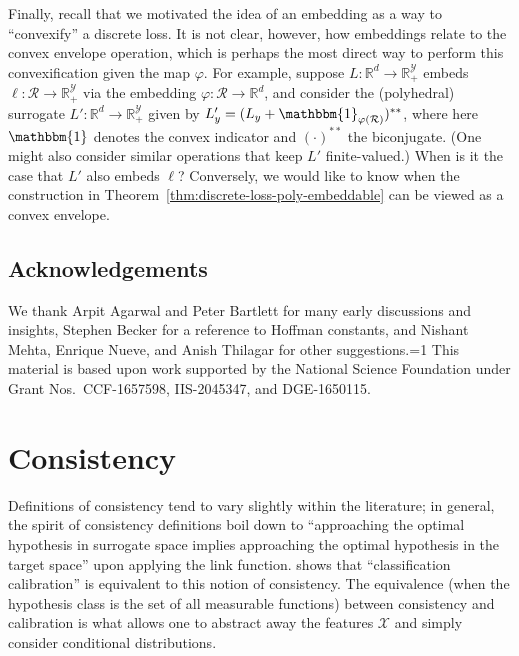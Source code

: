 \documentclass[twoside,11pt]{article}
\newcommand{\Comments}{1}
\newcommand{\mytodo}[2]{\ifnum\Comments=1%
  \todo[linecolor=#1!80!black,backgroundcolor=#1,bordercolor=#1!80!black]{#2}\fi}
\newcommand{\raft}[1]{\mytodo{green!20!white}{RF: #1}}
\newcommand{\reals}{\mathbb{R}}
\newcommand{\R}{\mathcal{R}}
\newcommand{\X}{\mathcal{X}}
\newcommand{\Y}{\mathcal{Y}}
\newcommand{\ones}{\mathbbm{1}}
\begin{document}
Finally, recall that we motivated the idea of an embedding as a way to ``convexify'' a discrete loss.
It is not clear, however, how embeddings relate to the convex envelope operation, which is perhaps the most direct way to perform this convexification given the map $\varphi$.
For example, suppose $L:\reals^d\to\reals^\Y_+$ embeds $\ell:\R\to\reals^\Y_+$ via the embedding $\varphi:\R\to\reals^d$, and consider the (polyhedral) surrogate $L':\reals^d\to\reals^\Y_+$ given by $L'_y = (L_y + \ones_{\varphi(\R)})^{**}$, where here $\ones$ denotes the convex indicator and $(\cdot)^{**}$ the biconjugate.
(One might also consider similar operations that keep $L'$ finite-valued.)
When is it the case that $L'$ also embeds $\ell$?
Conversely, we would like to know when the construction in Theorem~\ref{thm:discrete-loss-poly-embeddable} can be viewed as a convex envelope.


\subsection*{Acknowledgements}
We thank Arpit Agarwal and Peter Bartlett for many early discussions and insights,
Stephen Becker for a reference to Hoffman constants,
and Nishant Mehta, Enrique Nueve, and Anish Thilagar for other suggestions.\raft{others?}
This material is based upon work supported by the National Science Foundation under Grant Nos.\ CCF-1657598, IIS-2045347, and DGE-1650115.





\appendix

\section{Consistency}\label{app:consistency}
Definitions of consistency tend to vary slightly within the literature; in general, the spirit of consistency definitions boil down to ``approaching the optimal hypothesis in surrogate space implies approaching the optimal hypothesis in the target space'' upon applying the link function.
\citet[Theorem 1]{bartlett2006convexity} shows that ``classification calibration'' is equivalent to this notion of consistency.
The equivalence (when the hypothesis class is the set of all measurable functions) between consistency and calibration is what allows one to abstract away the features $\X$ and simply consider conditional distributions.
\end{document}
